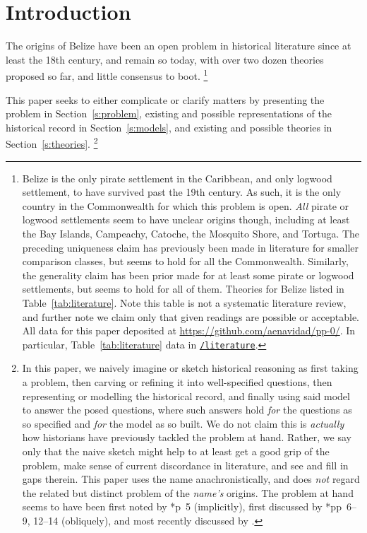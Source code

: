 
%
%
%
\section{Introduction}
\label{s:intro}
	The origins of Belize have been an open problem in historical literature since at least the 18th century, and remain so today, with over two dozen theories proposed so far, and little consensus to boot.%
	\footnote{Belize is the only pirate settlement in the Caribbean, and only logwood settlement, to have survived past the 19th century. As such, it is the only country in the Commonwealth for which this problem is open. \emph{All} pirate or logwood settlements seem to have unclear origins though, including at least the Bay Islands, Campeachy, Catoche, the Mosquito Shore, and Tortuga. The preceding uniqueness claim has previously been made in literature for smaller comparison classes, but seems to hold for all the Commonwealth. Similarly, the generality claim has been prior made for at least some pirate or logwood settlements, but seems to hold for all of them. Theories for Belize listed in Table~\ref{tab:literature}. Note this table is not a systematic literature review, and further note we claim only that given readings are possible or acceptable. All data for this paper deposited at \url{https://github.com/aenavidad/pp-0/}. In particular, Table~\ref{tab:literature} data in \href{https://github.com/aenavidad/pp-0/tree/main/literature}{\nolinkurl{/literature}}.}
	
	This paper seeks to either complicate or clarify matters by presenting the problem in Section~\ref{s:problem}, existing and possible representations of the historical record in Section~\ref{s:models}, and existing and possible theories in Section~\ref{s:theories}.%
	\footnote{In this paper, we naively imagine or sketch historical reasoning as first taking a problem, then carving or refining it into well-specified questions, then representing or modelling the historical record, and finally using said model to answer the posed questions, where such answers hold \emph{for} the questions as so specified and \emph{for} the model as so built. We do not claim this is \emph{actually} how historians have previously tackled the problem at hand. Rather, we say only that the naive sketch might help to at least get a good grip of the problem, make sense of current discordance in literature, and see and fill in gaps therein. This paper uses the name  anachronistically, and does \emph{not} regard the related but distinct problem of the \emph{name's} origins. The problem at hand seems to have been first noted by \cite{alm26}*{p~5} (implicitly), first discussed by \cite{nun77}*{pp~6--9, 12--14} (obliquely), and most recently discussed by .}
%
%
%
